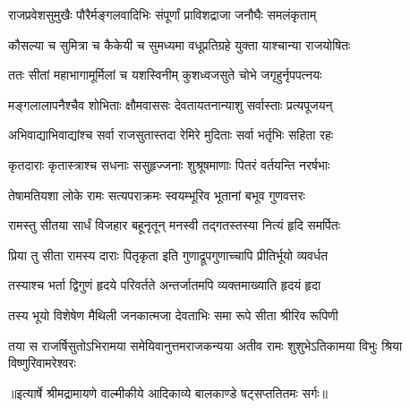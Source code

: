 \twolineshloka
{राजप्रवेशसुमुखैः पौरैर्मङ्गलवादिभिः}
{संपूर्णां प्राविशद्राजा जनौघैः समलंकृताम्} %

\twolineshloka
{कौसल्या च सुमित्रा च कैकेयी च सुमध्यमा}
{वधूप्रतिग्रहे युक्ता याश्चान्या राजयोषितः} %

\twolineshloka
{ततः सीतां महाभागामूर्मिलां च यशस्विनीम्}
{कुशध्वजसुते चोभे जगृहुर्नृपपत्नयः} %

\twolineshloka
{मङ्गलालापनैश्चैव शोभिताः क्षौमवाससः}
{देवतायतनान्याशु सर्वास्ताः प्रत्यपूजयन्} %

\twolineshloka
{अभिवाद्याभिवाद्यांश्च सर्वा राजसुतास्तदा}
{रेमिरे मुदिताः सर्वा भर्तृभिः सहिता रहः} %

\twolineshloka
{कृतदाराः कृतास्त्राश्च सधनाः ससुहृज्जनाः}
{शुश्रूषमाणाः पितरं वर्तयन्ति नरर्षभाः} %

\twolineshloka
{तेषामतियशा लोके रामः सत्यपराक्रमः}
{स्वयम्भूरिव भूतानां बभूव गुणवत्तरः} %

\twolineshloka
{रामस्तु सीतया सार्धं विजहार बहूनृतून्}
{मनस्वी तद्गतस्तस्या नित्यं हृदि समर्पितः} %

\twolineshloka
{प्रिया तु सीता रामस्य दाराः पितृकृता इति}
{गुणाद्रूपगुणाच्चापि प्रीतिर्भूयो व्यवर्धत} %

\twolineshloka
{तस्याश्च भर्ता द्विगुणं हृदये परिवर्तते}
{अन्तर्जातमपि व्यक्तमाख्याति हृदयं हृदा} %

\twolineshloka
{तस्य भूयो विशेषेण मैथिली जनकात्मजा}
{देवताभिः समा रूपे सीता श्रीरिव रूपिणी} %

\fourlineindentedshloka
{तया स राजर्षिसुतोऽभिरामया}
{ समेयिवानुत्तमराजकन्यया}
{अतीव रामः शुशुभेऽतिकामया}
{ विभुः श्रिया विष्णुरिवामरेश्वरः} %


{॥इत्यार्षे श्रीमद्रामायणे वाल्मीकीये आदिकाव्ये बालकाण्डे षट्सप्ततितमः सर्गः॥}

